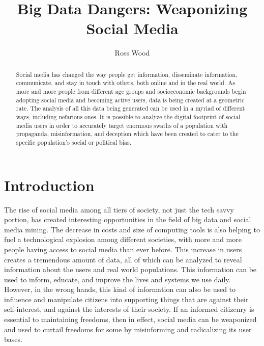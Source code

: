 \documentclass[sigconf]{acmart}
\begin{document}
\title{Big Data Dangers: Weaponizing Social Media}



\author{Ross Wood}

\renewcommand{\shortauthors}{B. Trovato et al.}


\begin{abstract}
Social media has changed the way people get information, disseminate information, communicate, and stay in touch with others, both online and in the real world. As more and more people from different age groups and socioeconomic backgrounds begin adopting social media and becoming active users, data is being created at a geometric rate. The analysis of all this data being generated can be used in a myriad of different ways, including nefarious ones. It is possible to analyze the digital footprint of social media users in order to accurately target enormous swaths of a population with propaganda, misinformation, and deception which have been created to cater to the specific population's social or political bias.
\end{abstract}



\maketitle

\section{Introduction}

The rise of social media among all tiers of society, not just the tech savvy portion, has created interesting opportunities in the field of big data and social media mining. The decrease in costs and size of computing tools is also helping to fuel a technological explosion among different societies, with more and more people having access to social media than ever before. This increase in users creates a tremendous amount of data, all of which can be analyzed to reveal information about the users and real world populations. This information can be used to inform, educate, and improve the lives and systems we use daily. However, in the wrong hands, this kind of information can also be used to influence and manipulate citizens into supporting things that are against their self-interest, and against the interests of their society. If an informed citizenry is essential to maintaining freedoms, then in effect, social media can be weaponized and used to curtail freedoms for some by  misinforming and radicalizing its user bases.
\end{document}
